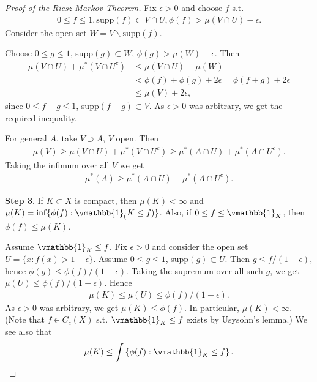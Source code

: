 \begin{proof}[Proof of the Riesz-Markov Theorem]
    Fix \(\epsilon>0\) and choose \(f\) s.t.
    \begin{align*}
        0\leq f\leq 1, \text{supp}(f)\subset V\cap U, \phi(f)>\mu\left(V\cap U\right) - \epsilon.
    \end{align*}
    Consider the open set \(W=V\backslash\text{supp}(f)\).

    Choose \(0\leq g\leq 1\), supp\((g)\subset W\), \(\phi(g)>\mu(W)-\epsilon\). Then
    \begin{align*}
        \mu\left(V\cap U\right) + \mu^*\left(V\cap U^c\right) &\leq \mu\left(V\cap U\right) + \mu(W) \\
        &< \phi(f) + \phi(g) + 2\epsilon = \phi(f+g) + 2\epsilon \\
        &\leq \mu(V) + 2\epsilon,
    \end{align*}
    since \(0\leq f+g\leq 1\), supp\((f+g)\subset V\). As \(\epsilon>0\) was arbitrary, we get the required inequality. 

    For general \(A\), take \(V\supset A\), \(V\) open. Then 
    \begin{align*}
        \mu(V) \geq \mu\left(V\cap U\right) + \mu^*\left(V\cap U^c\right) \geq \mu^*\left(A\cap U\right) + \mu^*\left(A\cap U^c\right).
    \end{align*}
    Taking the infimum over all \(V\) we get
    \begin{align*}
        \mu^*(A) \geq \mu^*\left(A\cap U\right) + \mu^*\left(A\cap U^c\right).
    \end{align*}
    
    \textbf{Step 3}. If \(K\subset X\) is compact, then \(\mu(K)<\infty\) and \(\mu(K)=\inf\{\phi(f):\vmathbb{1}_(K\leq f)\}\). Also, if \(0\leq f\leq \vmathbb{1}_K\), then \(\phi(f)\leq\mu(K)\).

    Assume \(\vmathbb{1}_K\leq f\). Fix \(\epsilon>0\) and consider the open set \(U=\{x:f(x)>1-\epsilon\}\). Assume \(0\leq g\leq 1\), supp\((g)\subset U\). Then \(g\leq f/(1-\epsilon)\), hence \(\phi(g)\leq \phi(f)/(1-\epsilon)\). Taking the supremum over all such \(g\), we get \(\mu(U)\leq \phi(f)/(1-\epsilon)\). Hence
    \begin{align*}
        \mu(K) \leq\mu(U)\leq\phi(f)/(1-\epsilon).
    \end{align*}
    As \(\epsilon>0\) was arbitrary, we get \(\mu(K)\leq\phi(f)\). In particular, \(\mu(K)<\infty\). (Note that \(f\in C_c(X)\) s.t. \(\vmathbb{1}_K\leq f\) exists by Usysohn's lemma.) We see also that 
    \begin{align*}
        \mu(K)\leq \int\left\{\phi(f):\vmathbb{1}_K\leq f\right\}.
    \end{align*}


\end{proof}
